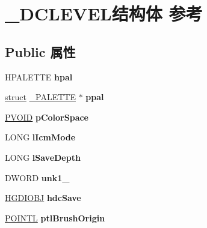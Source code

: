 \hypertarget{struct___d_c_l_e_v_e_l}{}\section{\+\_\+\+D\+C\+L\+E\+V\+E\+L结构体 参考}
\label{struct___d_c_l_e_v_e_l}
\subsection*{Public 属性}
\begin{DoxyCompactItemize}
\item 
\mbox{\label{struct___d_c_l_e_v_e_l_a71cf4d5bcee15e2df7c7a89b6f05f11f}} 
H\+P\+A\+L\+E\+T\+TE {\bfseries hpal}
\item 
\mbox{\label{struct___d_c_l_e_v_e_l_a8ed7a917ffbc32beeffe4a2a7ee4f440}} 
\hyperlink{interfacestruct}{struct} \hyperlink{struct___p_a_l_e_t_t_e}{\+\_\+\+P\+A\+L\+E\+T\+TE} $\ast$ {\bfseries ppal}
\item 
\mbox{\label{struct___d_c_l_e_v_e_l_aec9dc4b20e5141230a270221aca8c800}} 
\hyperlink{interfacevoid}{P\+V\+O\+ID} {\bfseries p\+Color\+Space}
\item 
\mbox{\label{struct___d_c_l_e_v_e_l_a797307d5b3d597eb3ff9a8e83361c08c}} 
L\+O\+NG {\bfseries l\+Icm\+Mode}
\item 
\mbox{\label{struct___d_c_l_e_v_e_l_a8bc01b9f320e65d49738ecbc4dca0157}} 
L\+O\+NG {\bfseries l\+Save\+Depth}
\item 
\mbox{\label{struct___d_c_l_e_v_e_l_ac4ea9a56564b4d3da8d214e540f8a7ff}} 
D\+W\+O\+RD {\bfseries unk1\+\_}
\item 
\mbox{\label{struct___d_c_l_e_v_e_l_a8c542a874813fbc8cac71bb9e31c656f}} 
\hyperlink{interfacevoid}{H\+G\+D\+I\+O\+BJ} {\bfseries hdc\+Save}
\item 
\mbox{\label{struct___d_c_l_e_v_e_l_a192d336ae3fbcea4e61fcaed54c64225}} 
\hyperlink{struct___p_o_i_n_t_l}{P\+O\+I\+N\+TL} {\bfseries ptl\+Brush\+Origin}
\item 

\end{DoxyCompactItemize}
